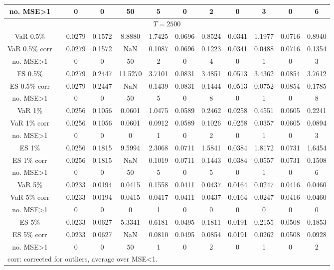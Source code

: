 {\begin{sidewaystable}
\begin{tabular}{cc cc cccc cccc}
no. MSE>1 && 0 & 0 & 50 & 5 & 0 & 2 &0 & 3 & 0 & 6 \\[1ex] 
\hline 
\multicolumn{12}{c}{$T =2500$}  \\ 
\hline 
VaR 0.5\% && 0.0279 & 0.1572 & 8.8880 & 1.7425 & 0.0696 & 0.8524 &0.0341 & 1.1977 & 0.0716 & 0.8940 \\ 
VaR 0.5\% corr && 0.0279 & 0.1572 &    NaN & 0.1087 & 0.0696 & 0.1223 &0.0341 & 0.0488 & 0.0716 & 0.1354 \\ 
no. MSE>1 && 0 & 0 & 50 & 2 & 0 & 4 &0 & 1 & 0 & 3 \\[1ex] 
ES 0.5\% && 0.0279 & 0.2447 & 11.5270 & 3.7101 & 0.0831 & 3.4851 &0.0513 & 3.4362 & 0.0854 & 3.7612 \\ 
ES 0.5\% corr && 0.0279 & 0.2447 &    NaN & 0.1439 & 0.0831 & 0.1444 &0.0513 & 0.0752 & 0.0854 & 0.1785 \\ 
no. MSE>1 && 0 & 0 & 50 & 5 & 0 & 8 &0 & 1 & 0 & 8 \\[1.5ex] 
VaR 1\% && 0.0256 & 0.1056 & 0.0601 & 1.0475 & 0.0589 & 0.2462 &0.0258 & 0.4551 & 0.0605 & 0.2241 \\ 
VaR 1\% corr && 0.0256 & 0.1056 & 0.0601 & 0.0912 & 0.0589 & 0.1026 &0.0258 & 0.0357 & 0.0605 & 0.0894 \\ 
no. MSE>1 && 0 & 0 & 0 & 1 & 0 & 2 &0 & 1 & 0 & 3 \\[1ex] 
ES 1\% && 0.0256 & 0.1815 & 9.5994 & 2.3068 & 0.0711 & 1.5841 &0.0384 & 1.8172 & 0.0731 & 1.6454 \\ 
ES 1\% corr && 0.0256 & 0.1815 &    NaN & 0.1019 & 0.0711 & 0.1443 &0.0384 & 0.0557 & 0.0731 & 0.1508 \\ 
no. MSE>1 && 0 & 0 & 50 & 5 & 0 & 5 &0 & 1 & 0 & 6 \\[1.5ex] 
VaR 5\% && 0.0233 & 0.0194 & 0.0415 & 0.1558 & 0.0411 & 0.0437 &0.0164 & 0.0247 & 0.0416 & 0.0460 \\ 
VaR 5\% corr && 0.0233 & 0.0194 & 0.0415 & 0.0417 & 0.0411 & 0.0437 &0.0164 & 0.0247 & 0.0416 & 0.0460 \\ 
no. MSE>1 && 0 & 0 & 0 & 1 & 0 & 0 &0 & 0 & 0 & 0 \\[1ex] 
ES 5\% && 0.0233 & 0.0627 & 5.3341 & 0.6181 & 0.0495 & 0.1811 &0.0191 & 0.2155 & 0.0508 & 0.1853 \\ 
ES 5\% corr && 0.0233 & 0.0627 &    NaN & 0.0810 & 0.0495 & 0.0854 &0.0191 & 0.0262 & 0.0508 & 0.0928 \\ 
no. MSE>1 && 0 & 0 & 50 & 1 & 0 & 2 &0 & 1 & 0 & 2 \\[1ex] 
\hline 
\multicolumn{12}{l}{\footnotesize{corr: corrected for outliers, average over MSE<1.}}  \\ 

\end{tabular}
\end{sidewaystable}}
